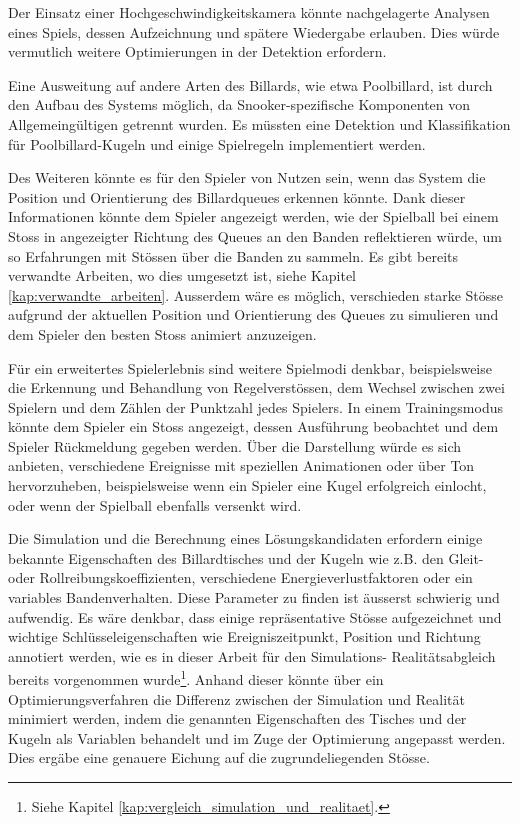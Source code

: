 Der Einsatz einer Hochgeschwindigkeitskamera könnte nachgelagerte Analysen eines Spiels,
dessen Aufzeichnung und spätere Wiedergabe erlauben.
Dies würde vermutlich weitere Optimierungen in der Detektion erfordern.

Eine Ausweitung auf andere Arten des Billards, wie etwa Poolbillard, ist durch den Aufbau des Systems möglich, da
Snooker-spezifische Komponenten von Allgemeingültigen getrennt wurden.
Es müssten eine Detektion und Klassifikation für Poolbillard-Kugeln und einige Spielregeln implementiert werden.

Des Weiteren könnte es für den Spieler von Nutzen sein, wenn das System die Position und Orientierung des Billardqueues
erkennen könnte.
Dank dieser Informationen könnte dem Spieler angezeigt werden, wie der Spielball bei einem Stoss in angezeigter Richtung des Queues
an den Banden reflektieren würde, um so Erfahrungen mit Stössen über die Banden zu sammeln.
Es gibt bereits verwandte Arbeiten, wo dies umgesetzt ist, siehe Kapitel \ref{kap:verwandte_arbeiten}.
Ausserdem wäre es möglich, verschieden starke Stösse aufgrund der aktuellen Position und Orientierung des Queues zu simulieren
und dem Spieler den besten Stoss animiert anzuzeigen.

Für ein erweitertes Spielerlebnis sind weitere Spielmodi denkbar, beispielsweise die Erkennung und Behandlung von
Regelverstössen, dem Wechsel zwischen zwei Spielern und dem Zählen der Punktzahl jedes Spielers.
In einem Trainingsmodus könnte dem Spieler ein Stoss angezeigt, dessen Ausführung beobachtet und dem Spieler
Rückmeldung gegeben werden.
Über die Darstellung würde es sich anbieten, verschiedene Ereignisse mit speziellen Animationen oder über Ton hervorzuheben,
beispielsweise wenn ein Spieler eine Kugel erfolgreich einlocht, oder wenn der Spielball ebenfalls versenkt wird.

Die Simulation und die Berechnung eines Lösungskandidaten erfordern einige bekannte Eigenschaften des Billardtisches und
der Kugeln wie z.B. den Gleit- oder Rollreibungskoeffizienten, verschiedene Energieverlustfaktoren oder ein variables
Bandenverhalten. Diese Parameter zu finden ist äusserst schwierig und aufwendig. Es wäre denkbar, dass einige repräsentative
Stösse aufgezeichnet und wichtige Schlüsseleigenschaften wie Ereigniszeitpunkt, Position und Richtung annotiert werden,
wie es in dieser Arbeit für den Simulations- Realitätsabgleich bereits vorgenommen
wurde\footnote{Siehe Kapitel \ref{kap:vergleich_simulation_und_realitaet}.}. Anhand dieser könnte über ein Optimierungsverfahren
die Differenz zwischen der Simulation und Realität minimiert werden, indem die genannten Eigenschaften des Tisches und
der Kugeln als Variablen behandelt und im Zuge der Optimierung angepasst werden. Dies ergäbe eine genauere Eichung auf
die zugrundeliegenden Stösse.